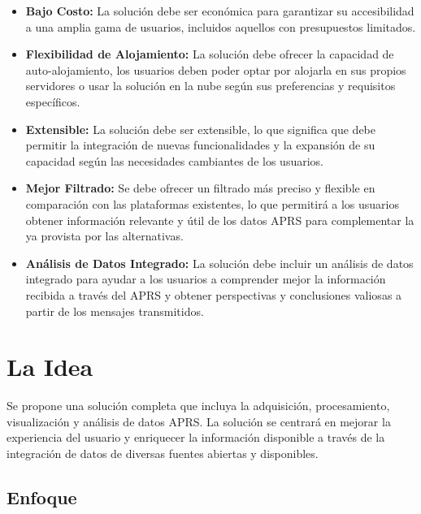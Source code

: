 \begin{itemize}
    \item \textbf{Bajo Costo:} La solución debe ser económica para garantizar su accesibilidad a una amplia gama de usuarios, incluidos aquellos con presupuestos limitados.
    
    \item \textbf{Flexibilidad de Alojamiento:} La solución debe ofrecer la capacidad de auto-alojamiento, los usuarios deben poder optar por alojarla en sus propios servidores o usar la solución en la nube según sus preferencias y requisitos específicos.
    
    \item \textbf{Extensible:} La solución debe ser extensible, lo que significa que debe permitir la integración de nuevas funcionalidades y la expansión de su capacidad según las necesidades cambiantes de los usuarios.
    
    \item \textbf{Mejor Filtrado:} Se debe ofrecer un filtrado más preciso y flexible en comparación con las plataformas existentes, lo que permitirá a los usuarios obtener información relevante y útil de los datos APRS para complementar la ya provista por las alternativas.
    
	\item \textbf{Análisis de Datos Integrado:} La solución debe incluir un análisis de datos integrado para ayudar a los usuarios a comprender mejor la información recibida a través del APRS y obtener perspectivas y conclusiones valiosas a partir de los mensajes transmitidos.
	
\end{itemize}

\section{La Idea}
Se propone una solución completa que incluya la adquisición, procesamiento, visualización y análisis de datos APRS. La solución se centrará en mejorar la experiencia del usuario y enriquecer la información disponible a través de la integración de datos de diversas fuentes abiertas y disponibles.

\subsection{Enfoque}


